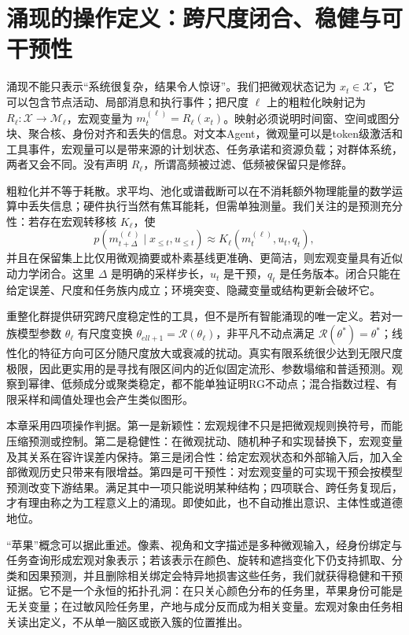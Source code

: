 \section{涌现的操作定义：跨尺度闭合、稳健与可干预性}
\label{sec:section_335}

涌现不能只表示“系统很复杂，结果令人惊讶”。我们把微观状态记为 $x_t\in\mathcal X$，它可以包含节点活动、局部消息和执行事件；把尺度 $\ell$ 上的粗粒化映射记为 $R_\ell:\mathcal X\to\mathcal M_\ell$，宏观变量为 $m_t^{(\ell)}=R_\ell(x_t)$。映射必须说明时间窗、空间或图分块、聚合核、身份对齐和丢失的信息。对文本Agent，微观量可以是token级激活和工具事件，宏观量可以是带来源的计划状态、任务承诺和资源负载；对群体系统，两者又会不同。没有声明 $R_\ell$，所谓高频被过滤、低频被保留只是修辞。

粗粒化并不等于耗散。求平均、池化或谱截断可以在不消耗额外物理能量的数学运算中丢失信息；硬件执行当然有焦耳能耗，但需单独测量。我们关注的是预测充分性：若存在宏观转移核 $K_\ell$，使
\[
 p(m_{t+\Delta}^{(\ell)}\mid x_{\le t},u_{\le t})
 \approx K_\ell(m_t^{(\ell)},u_t,q_t),
\]
并且在保留集上比仅用微观摘要或朴素基线更准确、更简洁，则宏观变量具有近似动力学闭合。这里 $\Delta$ 是明确的采样步长，$u_t$ 是干预，$q_t$ 是任务版本。闭合只能在给定误差、尺度和任务族内成立；环境突变、隐藏变量或结构更新会破坏它。

重整化群提供研究跨尺度稳定性的工具，但不是所有智能涌现的唯一定义。若对一族模型参数 $\theta_\ell$ 有尺度变换 $\theta_{ell+1}=\mathcal R(\theta_\ell)$，非平凡不动点满足 $\mathcal R(\theta^*)=\theta^*$；线性化的特征方向可区分随尺度放大或衰减的扰动。真实有限系统很少达到无限尺度极限，因此更实用的是寻找有限区间内的近似固定流形、参数塌缩和普适预测。观察到幂律、低频成分或聚类稳定，都不能单独证明RG不动点；混合指数过程、有限采样和阈值处理也会产生类似图形。

本章采用四项操作判据。第一是新颖性：宏观规律不只是把微观规则换符号，而能压缩预测或控制。第二是稳健性：在微观扰动、随机种子和实现替换下，宏观变量及其关系在容许误差内保持。第三是闭合性：给定宏观状态和外部输入后，加入全部微观历史只带来有限增益。第四是可干预性：对宏观变量的可实现干预会按模型预测改变下游结果。满足其中一项只能说明某种结构；四项联合、跨任务复现后，才有理由称之为工程意义上的涌现。即使如此，也不自动推出意识、主体性或道德地位。

“苹果”概念可以据此重述。像素、视角和文字描述是多种微观输入，经身份绑定与任务查询形成宏观对象表示；若该表示在颜色、旋转和遮挡变化下仍支持抓取、分类和因果预测，并且删除相关绑定会特异地损害这些任务，我们就获得稳健和干预证据。它不是一个永恒的拓扑孔洞：在只关心颜色分布的任务里，苹果身份可能是无关变量；在过敏风险任务里，产地与成分反而成为相关变量。宏观对象由任务相关读出定义，不从单一脑区或嵌入簇的位置推出。

